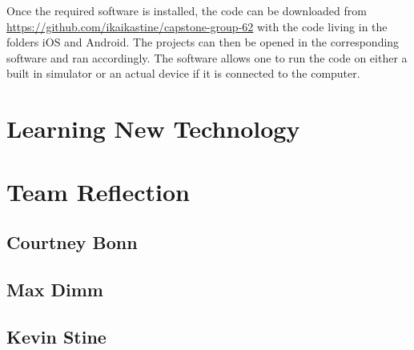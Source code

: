 \documentclass[letterpaper,10pt,draftclsnofoot,onecolumn,titlepage]{IEEEtran}
\begin{document}
Once the required software is installed, the code can be downloaded from \url{https://github.com/ikaikastine/capstone-group-62} with the code living in the folders iOS and Android. 
The projects can then be opened in the corresponding software and ran accordingly. 
The software allows one to run the code on either a built in simulator or an actual device if it is connected to the computer. 



\section{Learning New Technology}

\section{Team Reflection}

	\subsection{Courtney Bonn}
	
	\subsection{Max Dimm}
	
	\subsection{Kevin Stine}
	
\end{document}

